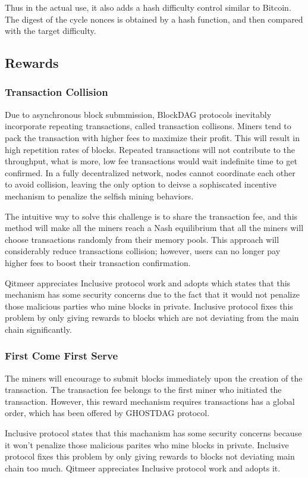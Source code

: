 \documentclass[a4paper,11pt]{article}
\begin{document}
Thus in the actual use, it also adds a hash difficulty control similar to Bitcoin. The digest of the cycle nonces is obtained by a hash function,
and then compared with the target difficulty.

\subsection{Rewards}
\subsubsection{Transaction Collision}
Due to asynchronous block submmission, BlockDAG protocols inevitably incorporate repeating transactions, called transaction collisons.
Miners tend to pack the transaction with higher fees to maximize their profit. This will result in high repetition rates of blocks. Repeated transactions will not contribute to the throughput, what is more, low fee transactions would wait indefinite time to get confirmed. In a fully decentralized network, nodes cannot coordinate each other to avoid collision, leaving the only option to deivse a sophiscated incentive mechanism to penalize the selfish mining behaviors.

The intuitive way to solve this challenge is to share the transaction fee, and this method will make all the miners reach a Nash equilibrium that all the miners will choose transactions randomly from their memory pools. This approach will considerably reduce transactions collision; however, users can no longer pay higher fees to boost their transaction confirmation.

Qitmeer appreciates Inclusive protocol work and adopts which states that this mechanism has some security concerns due to the fact that  it would not penalize those malicious parties who mine blocks in private. Inclusive protocol fixes this problem by only giving rewards to blocks  which are not deviating from the main chain significantly. 

\subsubsection{First Come First Serve}
The miners will encourage to submit blocks immediately upon the creation of the transaction. The transaction fee belongs to the first miner who initiated the transaction. However, this reward mechanism requires transactions has a global order, which has been offered by GHOSTDAG protocol.

Inclusive protocol states that this machanism has some security concerns because it won't penalize those malicious parites who mine blocks in private. Inclusive protocol fixes this problem by only giving rewards to blocks not deviating main chain too much. Qitmeer appreciates Inclusive protocol work and adopts it.
\end{document}
